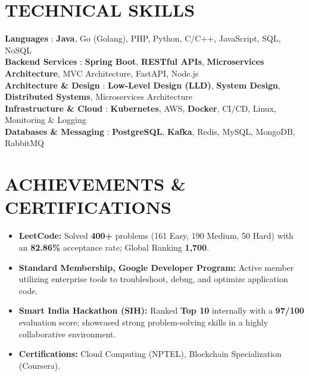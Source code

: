 \documentclass[letterpaper,11pt]{article}
\newcommand{\resumeItem}[1]{\item\small{{#1 \vspace{-1pt}}}}
\newcommand{\resumeItemListStart}{\begin{itemize}}
\newcommand{\resumeItemListEnd}{\end{itemize}\vspace{0pt}}
\begin{document}
\section{TECHNICAL SKILLS}
 \begin{itemize}[leftmargin=0in, label={}]
    \small{\item{
     \textbf{Languages} {: \textbf{Java}, Go (Golang), PHP, Python, C/C++, JavaScript, SQL, NoSQL}\vspace{2pt} \\
     \textbf{Backend Services} {: \textbf{Spring Boot}, \textbf{RESTful APIs}, \textbf{Microservices Architecture}, MVC Architecture, FastAPI, Node.js}\vspace{2pt} \\
     \textbf{Architecture \& Design} {: \textbf{Low-Level Design (LLD)}, \textbf{System Design}, \textbf{Distributed Systems}, Microservices Architecture}\vspace{2pt} \\
     \textbf{Infrastructure \& Cloud} {: \textbf{Kubernetes}, AWS, \textbf{Docker}, CI/CD, Linux, Monitoring \& Logging}\vspace{2pt} \\
     \textbf{Databases \& Messaging} {: \textbf{PostgreSQL}, \textbf{Kafka}, Redis, MySQL, MongoDB, RabbitMQ}
    }}
 \end{itemize}

\section{ACHIEVEMENTS \& CERTIFICATIONS}
    \resumeItemListStart
        \resumeItem{\textbf{LeetCode:} Solved \textbf{400+} problems (161 Easy, 190 Medium, 50 Hard) with an \textbf{82.86\%} acceptance rate; Global Ranking \textbf{1,700}.}
        \resumeItem{\textbf{Standard Membership, Google Developer Program:} Active member utilizing enterprise tools to troubleshoot, debug, and optimize application code.}
        \resumeItem{\textbf{Smart India Hackathon (SIH):} Ranked \textbf{Top 10} internally with a \textbf{97/100} evaluation score; showcased strong problem-solving skills in a highly collaborative environment.}
        \resumeItem{\textbf{Certifications:} Cloud Computing (NPTEL), Blockchain Specialization (Coursera).}
    \resumeItemListEnd
\end{document}
